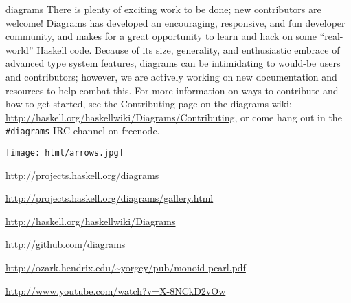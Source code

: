 \begin{hcarentry}[updated]{diagrams}
There is plenty of exciting work to be done; new contributors are
welcome!  Diagrams has developed an encouraging, responsive, and fun
developer community, and makes for a great opportunity to learn and
hack on some ``real-world'' Haskell code.  Because of its size,
generality, and enthusiastic embrace of advanced type system features,
diagrams can be intimidating to would-be users and contributors;
however, we are actively working on new documentation and resources to
help combat this.  For more information on ways to contribute and how
to get started, see the Contributing page on the diagrams wiki:
\url{http://haskell.org/haskellwiki/Diagrams/Contributing}, or come
hang out in the \texttt{\#diagrams} IRC channel on freenode.

\begin{center}
\texttt{[image: html/arrows.jpg]}
\end{center}

\FurtherReading
\begin{compactitem}
\item \url{http://projects.haskell.org/diagrams}
\item \url{http://projects.haskell.org/diagrams/gallery.html}
\item \url{http://haskell.org/haskellwiki/Diagrams}
\item \url{http://github.com/diagrams}
\item \url{http://ozark.hendrix.edu/~yorgey/pub/monoid-pearl.pdf}
\item \url{http://www.youtube.com/watch?v=X-8NCkD2vOw}
\end{compactitem}
\end{hcarentry}
